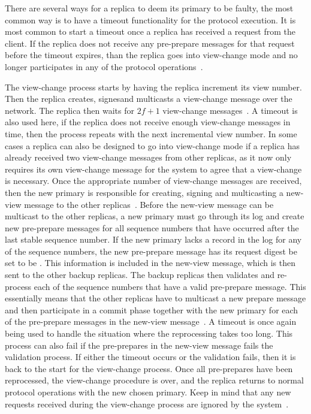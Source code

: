 There are several ways for a replica to deem its primary to be faulty, the most common way is to have a timeout functionality for the protocol execution. It is most common to start a timeout once a replica has received a request from the client. If the replica does not receive any pre-prepare messages for that request before the timeout expires, than the replica goes into view-change mode and no longer participates in any of the protocol operations~\cites{SLIDES:PBFT}[p.~5-6]{PAPER:OGPBFT}[p.~263]{BOOK:BuildDepDistSyst}.  

The view-change process starts by having the replica increment its view number. Then the replica creates, signesand multicasts a view-change message over the network. The replica  then waits for $2f+1$ view-change messages~\cites{SLIDES:PBFT}[p.~6]{PAPER:OGPBFT}[p.~411]{PAPER:PBFTRecovery}{WEB:SawtoothPBFT}. A timeout is also used here, if the replica does not receive enough view-change messages in time, then the process repeats with the next incremental view number. In some cases a replica can also be designed to go into view-change mode if a replica has already received two view-change messages from other replicas, as it now only requires its own view-change message for the system to agree that a view-change is necessary\cite{BOOK:BuildDepDistSyst}. Once the appropriate number of view-change messages are received, then the new primary is responsible for creating, signing and multicasting a new-view message to the other replicas~\cite[p.~264]{BOOK:BuildDepDistSyst}. Before the new-view message can be multicast to the other replicas, a new primary must go through its log and create new pre-prepare messages for all sequence numbers that have occurred after the last stable sequence number. If the new primary lacks a record in the log for any of the sequence numbers, the new pre-prepare message has its request digest be set to be . This information is included in the new-view message, which is then sent to the other backup replicas. The backup replicas then validates and re-process each of the sequence numbers that have a valid pre-prepare message. This essentially means that the other replicas have to multicast a new prepare message and then participate in a commit phase together with the new primary for each of the pre-prepare messages in the new-view message~\cites[p.~6]{PAPER:OGPBFT}[p.~458]{BOOK:MVstandver3}[p.~265]{BOOK:BuildDepDistSyst}. A timeout is once again being used to handle the situation where the reprocessing takes too long. This process can also fail if the pre-prepares in the new-view message fails the validation process. If either the timeout occurs or the validation fails, then it is back to the start for the view-change process. Once all pre-prepares have been reprocessed, the view-change procedure is over, and the replica returns to normal protocol operations with the new chosen primary. Keep in mind that any new requests received during the view-change process are ignored by the system~\cite[p.~263]{BOOK:BuildDepDistSyst}. 

